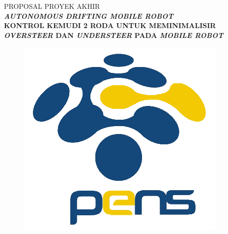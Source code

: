 \begin{sampul}
\begin{center}
	\Large{PROPOSAL PROYEK AKHIR}\\[0.5cm]
	\vspace{0.2cm}
	\textbf{\textit{AUTONOMOUS DRIFTING MOBILE ROBOT}}\\
	\textbf{KONTROL KEMUDI 2 RODA UNTUK MEMINIMALISIR}
	\textbf{\textit{OVERSTEER} DAN \textit{UNDERSTEER} PADA \textit{MOBILE ROBOT}}
	\vspace{0.5cm}
	\begin{figure}[H]
		\centering
		\includegraphics[width=3 in]{Sampul/Figs/Logo_PENS.png}
	\end{figure}
	
	
\end{center}
\end{sampul}